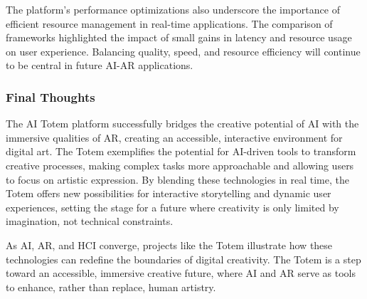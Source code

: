 The platform’s performance optimizations also underscore the importance of efficient resource management in real-time applications.
The comparison of frameworks highlighted the impact of small gains in latency and resource usage on user experience.
Balancing quality, speed, and resource efficiency will continue to be central in future AI-AR applications.%

\subsubsection{Final Thoughts}
The AI Totem platform successfully bridges the creative potential of AI with the immersive qualities of AR, creating an accessible, interactive environment for digital art.
The Totem exemplifies the potential for AI-driven tools to transform creative processes, making complex tasks more approachable and allowing users to focus on artistic expression.
By blending these technologies in real time, the Totem offers new possibilities for interactive storytelling and dynamic user experiences, setting the stage for a future where creativity is only limited by imagination, not technical constraints.

As AI, AR, and HCI converge, projects like the Totem illustrate how these technologies can redefine the boundaries of digital creativity.
The Totem is a step toward an accessible, immersive creative future, where AI and AR serve as tools to enhance, rather than replace, human artistry.